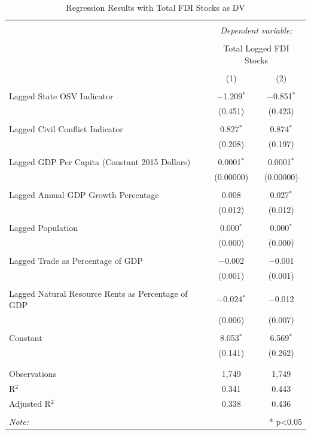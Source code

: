 \documentclass[11pt, titlepage]{article} %
\begin{document}
\begin{table}[!htbp] \centering 
  \caption{Regression Results with Total FDI Stocks as DV} 
  \label{appreg4} 
\small 
\begin{tabular}{@{\extracolsep{5pt}}lcc} 
\\[-1.8ex]\hline 
\hline \\[-1.8ex] 
 & \multicolumn{2}{c}{\textit{Dependent variable:}} \\ 
\cline{2-3} 
\\[-1.8ex] & \multicolumn{2}{c}{Total Logged FDI Stocks} \\ 
\\[-1.8ex] & (1) & (2)\\ 
\hline \\[-1.8ex] 
 Lagged State OSV Indicator & $-$1.209$^{*}$ & $-$0.851$^{*}$ \\ 
  & (0.451) & (0.423) \\ 
  & & \\ 
 Lagged Civil Conflict Indicator & 0.827$^{*}$ & 0.874$^{*}$ \\ 
  & (0.208) & (0.197) \\ 
  & & \\ 
 Lagged GDP Per Capita (Constant 2015 Dollars) & 0.0001$^{*}$ & 0.0001$^{*}$ \\ 
  & (0.00000) & (0.00000) \\ 
  & & \\ 
 Lagged Annual GDP Growth Percentage & 0.008 & 0.027$^{*}$ \\ 
  & (0.012) & (0.012) \\ 
  & & \\ 
 Lagged Population & 0.000$^{*}$ & 0.000$^{*}$ \\ 
  & (0.000) & (0.000) \\ 
  & & \\ 
 Lagged Trade as Percentage of GDP & $-$0.002 & $-$0.001 \\ 
  & (0.001) & (0.001) \\ 
  & & \\ 
 Lagged Natural Resource Rents as Percentage of GDP & $-$0.024$^{*}$ & $-$0.012 \\ 
  & (0.006) & (0.007) \\ 
  & & \\ 
 Constant & 8.053$^{*}$ & 6.569$^{*}$ \\ 
  & (0.141) & (0.262) \\ 
  & & \\ 
\hline \\[-1.8ex] 
Observations & 1,749 & 1,749 \\ 
R$^{2}$ & 0.341 & 0.443 \\ 
Adjusted R$^{2}$ & 0.338 & 0.436 \\ 
\hline 
\hline \\[-1.8ex] 
\textit{Note:}  & \multicolumn{2}{r}{* p<0.05} \\ 
\end{tabular} 
\end{table}
\end{document}
